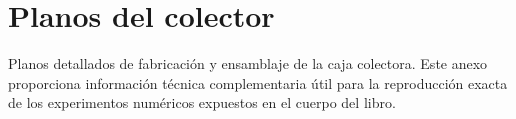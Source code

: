 \chapter{Planos del colector}
\label{chap:anexoD}

Planos detallados de fabricación y ensamblaje de la caja colectora.
Este anexo proporciona información técnica complementaria útil para la reproducción exacta de los experimentos numéricos expuestos en el cuerpo del libro.
